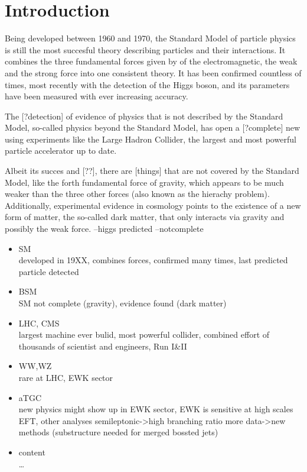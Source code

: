 \chapter*{Introduction}
Being developed between 1960 and 1970, the Standard Model of particle physics is still the most succesful theory describing particles and their interactions. It combines the three fundamental forces given by of the electromagnetic, the weak and the strong force into one consistent theory. It has been confirmed countless of times, most recently with the detection of the Higgs boson, and its parameters have been measured with ever increasing accuracy. 

The [?detection] of evidence of physics that is not described by the Standard Model, so-called physics beyond the Standard Model, has open a [?complete] new 
using experiments like the Large Hadron Collider, the largest and most powerful particle accelerator up to date.

Albeit its succes and [??], there are [things] that are not covered by the Standard Model, like the forth fundamental force of gravity, which appears to be much weaker than the three other forces (also known as the hierachy problem). Additionally, experimental evidence in cosmology points to the existence of a new form of matter, the so-called dark matter, that only interacts via gravity and possibly the weak force.
--higgs predicted --notcomplete
\begin{itemize}

\item{SM}\\
developed in 19XX, combines forces, confirmed many times, last predicted particle detected

\item{BSM}\\
SM not complete (gravity), evidence found (dark matter)

\item{LHC, CMS}\\
largest machine ever bulid, most powerful collider, combined effort of thousands of scientist and engineers, Run I&II

\item{WW,WZ}\\
rare at LHC, EWK sector

\item{aTGC}\\
new physics might show up in EWK sector, EWK is sensitive at high scales EFT, other analyses
semileptonic->high branching ratio
more data->new methods (substructure needed for merged bossted jets)

\item{content}\\
\dots
\end{itemize}
